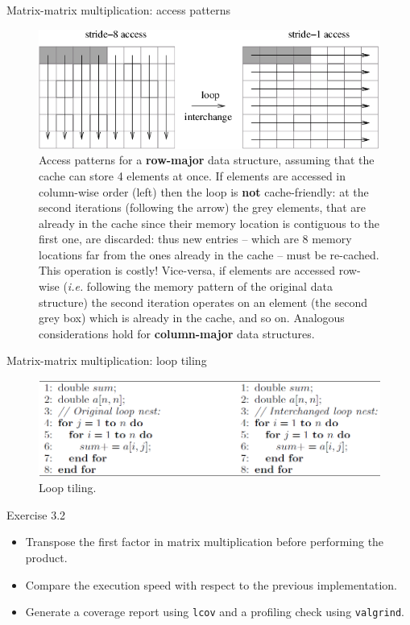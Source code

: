 \documentclass[10pt]{beamer}
\begin{document}
\begin{frame}{Matrix-matrix multiplication: access patterns}
    \begin{figure}
        \centering
        \includegraphics[width=\textwidth]{images/access_patterns.png}
        \caption{Access patterns for a \textbf{row-major} data structure, assuming that the cache can store 4 elements at once. If elements are accessed in column-wise order (left) then the loop is \textbf{not} cache-friendly: at the second iterations (following the arrow) the grey elements, that are already in the cache since their memory location is contiguous to the first one, are discarded: thus new entries -- which are 8 memory locations far from the ones already in the cache -- must be re-cached. This operation is costly! Vice-versa, if elements are accessed row-wise (\textit{i.e.} following the memory pattern of the original data structure) the second iteration operates on an element (the second grey box) which is already in the cache, and so on. Analogous considerations hold for \textbf{column-major} data structures.}
    \end{figure}
\end{frame}

\begin{frame}{Matrix-matrix multiplication: loop tiling}
    \begin{figure}
        \centering
        \includegraphics[width=\textwidth]{images/loop_tiling.png}
        \caption{Loop tiling.}
    \end{figure}
\end{frame}

\begin{frame}{Exercise 3.2}
    \begin{itemize}
        \item Transpose the first factor in matrix multiplication before performing the product.
        \item Compare the execution speed with respect to the previous implementation.
        \item Generate a coverage report using \texttt{lcov} and a profiling check using \texttt{valgrind}.
    \end{itemize}
\end{frame}
\end{document}
